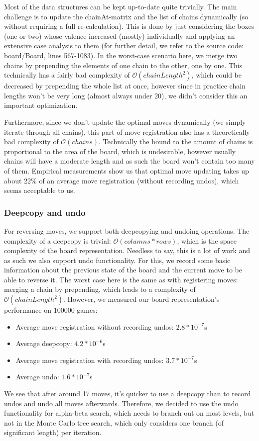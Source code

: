 Most of the data structures can be kept up-to-date quite trivially. The main challenge is to update the chainAt-matrix and the list of chains dynamically (so without requiring a full re-calculation). This is done by just considering the boxes (one or two) whose valence increased (mostly) individually and applying an extensive case analysis to them (for further detail, we refer to the source code: board/Board, lines 567-1083). In the worst-case scenario here, we merge two chains by prepending the elements of one chain to the other, one by one. This technically has a fairly bad complexity of $\mathcal{O}(chainLength^2)$, which could be decreased by prepending the whole list at once, however since in practice chain lengths won't be very long (almost always under 20), we didn't consider this an important optimization.

	Furthermore, since we don't update the optimal moves dynamically (we simply iterate through all chains), this part of move registration also has a theoretically bad complexity of $\mathcal{O}(chains)$. Technically the bound to the amount of chains is proportional to the area of the board, which is undesirable, however usually chains will have a moderate length and as such the board won't contain too many of them. Empirical measurements show us that optimal move updating takes up about 22\% of an average move registration (without recording undos), which seems acceptable to us.

\subsubsection{Deepcopy and undo}

For reversing moves, we support both deepcopying and undoing operations. The complexity of a deepcopy is trivial: $\mathcal{O}(columns*rows)$, which is the space complexity of the board representation. Needless to say, this is a lot of work and as such we also support undo functionality. For this, we record some basic information about the previous state of the board and the current move to be able to reverse it. The worst case here is the same as with registering moves: merging a chain by prepending, which leads to a complexity of $\mathcal{O}(chainLength^2)$. However, we measured our board representation's performance on 100000 games:
\begin{itemize}
\item Average move registration without recording undos: $2.8*10^{-7}$s
\item Average deepcopy: $4.2*10^{-6}$s
\item Average move registration with recording undos: $3.7*10^{-7}$s
\item Average undo: $1.6*10^{-7}$s
\end{itemize}
We see that after around 17 moves, it's quicker to use a deepcopy than to record undos and undo all moves afterwards. Therefore, we decided to use the undo functionality for alpha-beta search, which needs to branch out on most levels, but not in the Monte Carlo tree search, which only considers one branch (of significant length) per iteration.

